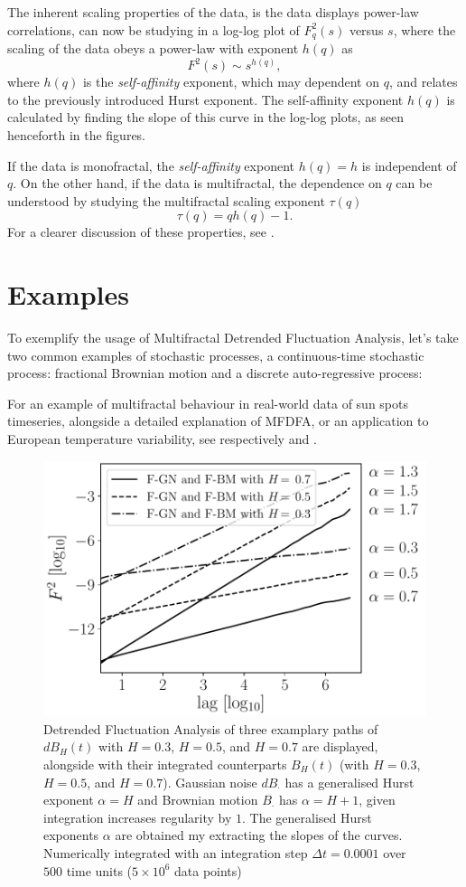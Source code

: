 \documentclass[pre, a4paper, aps, floatfix, superscriptaddress, onecolumn, notitlepage]{revtex4-1} %
\begin{document}
The inherent scaling properties of the data, is the data displays power-law correlations, can now be studying in a log-log plot of $F_q^2(s)$ versus $s$, where the scaling of the data obeys a power-law with exponent $h(q)$ as
\begin{equation}
  F^2(s) \sim s^{h(q)},
\end{equation}
where $h(q)$ is the \textit{self-affinity} exponent, which may dependent on $q$, and relates to the previously introduced Hurst exponent.
The self-affinity exponent $h(q)$ is calculated by finding the slope of this curve in the log-log plots, as seen henceforth in the figures.

If the data is monofractal, the \textit{self-affinity} exponent $h(q)=h$ is independent of $q$.
On the other hand, if the data is multifractal, the dependence on $q$ can be understood by studying the multifractal scaling exponent $\tau(q)$ \cite{Barabasi1991}
\begin{equation}
  \tau(q) = qh(q) - 1.
\end{equation}
For a clearer discussion of these properties, see \cite{Kantelhardt2002,Barabasi1991}.


\section{Examples}

To exemplify the usage of Multifractal Detrended Fluctuation Analysis, let's take two common examples of stochastic processes, a continuous-time stochastic process: fractional Brownian motion and a discrete auto-regressive process:

For an example of multifractal behaviour in real-world data of sun spots timeseries, alongside a detailed explanation of MFDFA, or an application to European temperature variability, see respectively \cite{Movahed2006} and \cite{Meyer2019}.

\begin{figure}[h]
  \includegraphics[width = 0.5\linewidth]{fig1.pdf}
  \caption{Detrended Fluctuation Analysis of three examplary paths of $dB_H(t)$ with $H=0.3$, $H=0.5$, and $H=0.7$ are displayed, alongside with their integrated counterparts $B_H(t)$ (with $H=0.3$, $H=0.5$, and $H=0.7$).
  Gaussian noise $dB_\cdot$ has a generalised Hurst exponent $\alpha = H$ and Brownian motion $B_\cdot$ has $\alpha = H + 1$, given integration increases regularity by $1$.
  The generalised Hurst exponents $\alpha$ are obtained my extracting the slopes of the curves.
  Numerically integrated with an integration step $\Delta t = 0.0001$ over $500$ time units ($5\times10^6$ data points)}\label{fig:1}
\end{figure}
\end{document}
